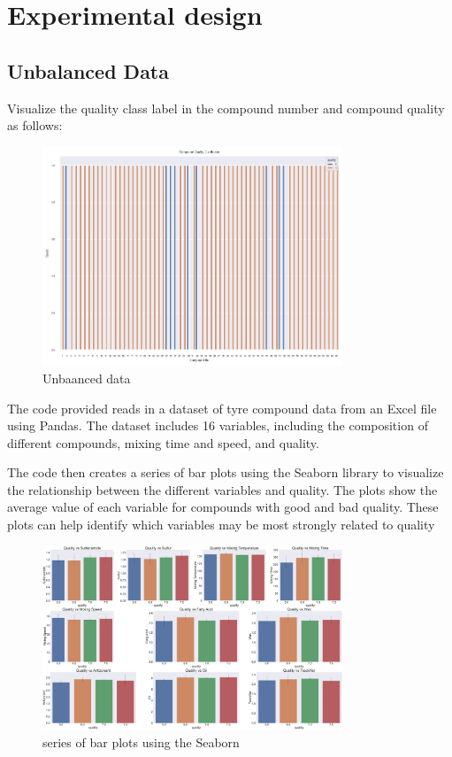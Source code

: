 \documentclass{article}
\begin{document}
\section{Experimental design}



\subsection{Unbalanced Data}

Visualize the quality class label in the compound number and compound quality
as follows:

\begin{figure}[h!]
  \centering
  \includegraphics[width=0.8\textwidth]{unbalanced data.png}
  \caption{Unbaanced data}
\end{figure}




The code provided reads in a dataset of tyre compound data from an Excel file using Pandas. The dataset includes 16 variables, including the composition of different compounds, mixing time and speed, and quality.

The code then creates a series of bar plots using the Seaborn library to visualize the relationship between the different variables and quality. The plots show the average value of each variable for compounds with good and bad quality. These plots can help identify which variables may be most strongly related to quality


\begin{figure}[h!]
  \centering
  \includegraphics[width=0.8\textwidth]{1.png}
  \caption{series of bar plots using the Seaborn}
\end{figure}
\end{document}
